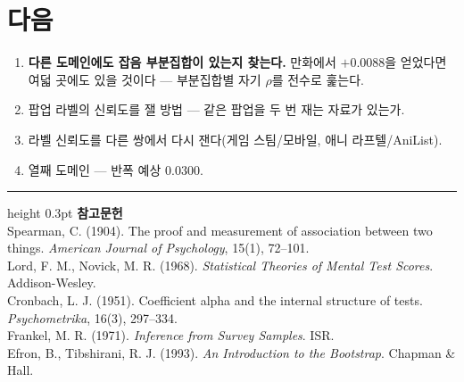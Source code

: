 \documentclass[10pt]{article}
\begin{document}
\section{다음}

\begin{enumerate}[leftmargin=1.3em,itemsep=0.15em]
\item \textbf{다른 도메인에도 잡음 부분집합이 있는지 찾는다.} 만화에서
      $+$0.0088을 얻었다면 여덟 곳에도 있을 것이다 --- 부분집합별 자기 $\rho$를
      전수로 훑는다.
\item 팝업 라벨의 신뢰도를 잴 방법 --- 같은 팝업을 두 번 재는 자료가 있는가.
\item 라벨 신뢰도를 다른 쌍에서 다시 잰다(게임 스팀/모바일, 애니 라프텔/AniList).
\item 열째 도메인 --- 반폭 예상 0.0300.
\end{enumerate}

\vspace{0.6em}
\hrule height 0.3pt
\vspace{0.5em}
{\footnotesize
\textbf{참고문헌}\\[0.3em]
Spearman, C. (1904). The proof and measurement of association between two things.
\emph{American Journal of Psychology}, 15(1), 72--101.\\[0.15em]
Lord, F. M., Novick, M. R. (1968). \emph{Statistical Theories of Mental Test
Scores}. Addison-Wesley.\\[0.15em]
Cronbach, L. J. (1951). Coefficient alpha and the internal structure of tests.
\emph{Psychometrika}, 16(3), 297--334.\\[0.15em]
Frankel, M. R. (1971). \emph{Inference from Survey Samples}. ISR.\\[0.15em]
Efron, B., Tibshirani, R. J. (1993). \emph{An Introduction to the Bootstrap}.
Chapman \& Hall.
}
\end{document}
